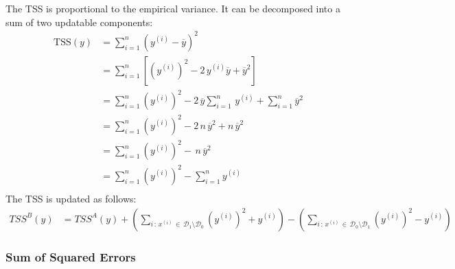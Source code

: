 \documentclass[a4paper, 11pt]{article}
\newcommand{\Data}{\mathcal{D}}
\begin{document}
The TSS is proportional to the empirical variance. It can be decomposed into a sum of two updatable components:
\begin{align*}
\text{TSS}(y) &= \sum_{i = 1}^{n} \left(y^{(i)} - \overline{y}\right)^2 \\
&= \sum_{i = 1}^{n} \left[\left(y^{(i)}\right)^2 - 2\, y^{(i)}  \overline{y} +  \overline{y}^2\right] \\
&= \sum_{i = 1}^{n} \left(y^{(i)}\right)^2 - 2\,\overline{y} \sum_{i = 1}^{n} \, y^{(i)}  +  \sum_{i = 1}^{n}  \overline{y}^2 \\
&= \sum_{i = 1}^{n} \left(y^{(i)}\right)^2 - 2\,n\,\overline{y}^2 + n\, \overline{y}^2 \\
&= \sum_{i = 1}^{n} \left(y^{(i)}\right)^2 - \,n\,\overline{y}^2\\
&= \sum_{i = 1}^{n} \left(y^{(i)}\right)^2 - \sum_{i = 1}^{n} y^{(i)}\\
\end{align*}
The TSS is updated as follows:
\begin{align*}
    TSS^B(y) &= TSS^A(y)  + \left(\sum_{i \,:\, x^{(i)} \, \in \, \mathcal{D}_1 \setminus \mathcal{D}_0} \left(y^{(i)}\right)^2 + y^{(i)}\right) - \left(\sum_{i \,:\, x^{(i)} \, \in \, \Data_0 \setminus \mathcal{D}_1}  \left(y^{(i)}\right)^2  -  y^{(i)}\right)
\end{align*}


\subsubsection{Sum of Squared Errors}
\end{document}

